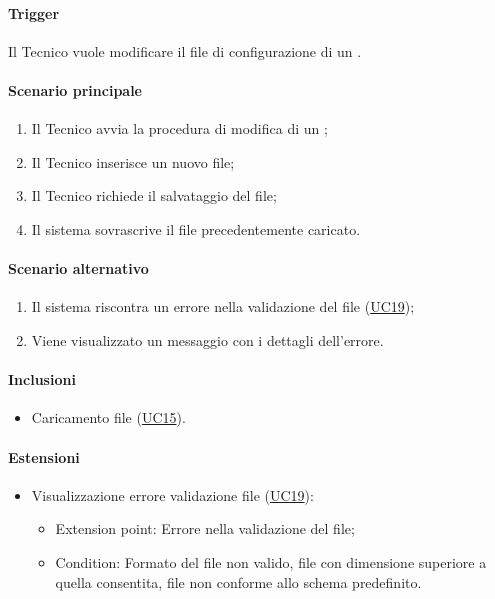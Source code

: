 \paragraph*{Trigger}
Il Tecnico vuole modificare il file di configurazione di un .

\paragraph*{Scenario principale}
\begin{enumerate}
  \item Il Tecnico avvia la procedura di modifica di un ;
  \item Il Tecnico inserisce un nuovo file;
  \item Il Tecnico richiede il salvataggio del file;
  \item Il sistema sovrascrive il file precedentemente caricato.
\end{enumerate}

\paragraph*{Scenario alternativo}
\begin{enumerate}
  \item Il sistema riscontra un errore nella validazione del file (\hyperref[UC19]{UC19});
  \item Viene visualizzato un messaggio con i dettagli dell'errore.
\end{enumerate}

\paragraph*{Inclusioni}
\begin{itemize}
  \item Caricamento file  (\hyperref[UC15]{UC15}).
\end{itemize}

\paragraph*{Estensioni}
\begin{itemize}
  \item Visualizzazione errore validazione file (\hyperref[UC19]{UC19}):
  \begin{itemize}
    \item Extension point: Errore nella validazione del file;
    \item Condition: Formato del file non valido, file con dimensione superiore a quella consentita, file non conforme allo schema predefinito.
  \end{itemize}
\end{itemize}